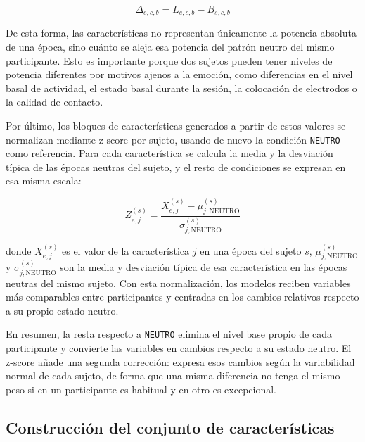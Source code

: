 \begin{myequation}[H]
\[
\Delta_{e,c,b} = L_{e,c,b} - B_{s,c,b}
\]
\caption{Diferencia logarítmica respecto a la condición neutra del mismo sujeto.}
\label{eq:delta_neutro}
\end{myequation}

De esta forma, las características no representan únicamente la potencia absoluta de una época, sino cuánto se aleja esa potencia del patrón neutro del mismo participante. Esto es importante porque dos sujetos pueden tener niveles de potencia diferentes por motivos ajenos a la emoción, como diferencias en el nivel basal de actividad, el estado basal durante la sesión, la colocación de electrodos o la calidad de contacto.

Por último, los bloques de características generados a partir de estos valores se normalizan mediante z-score por sujeto, usando de nuevo la condición \texttt{NEUTRO} como referencia. Para cada característica se calcula la media y la desviación típica de las épocas neutras del sujeto, y el resto de condiciones se expresan en esa misma escala:

\begin{myequation}[H]
\[
Z_{e,j}^{(s)} = \frac{X_{e,j}^{(s)} - \mu_{j,\mathrm{NEUTRO}}^{(s)}}{\sigma_{j,\mathrm{NEUTRO}}^{(s)}}
\]
\caption{Normalización z-score por sujeto usando la condición neutra como referencia.}
\label{eq:zscore_neutro}
\end{myequation}

donde \(X_{e,j}^{(s)}\) es el valor de la característica \(j\) en una época del sujeto \(s\), \(\mu_{j,\mathrm{NEUTRO}}^{(s)}\) y \(\sigma_{j,\mathrm{NEUTRO}}^{(s)}\) son la media y desviación típica de esa característica en las épocas neutras del mismo sujeto. Con esta normalización, los modelos reciben variables más comparables entre participantes y centradas en los cambios relativos respecto a su propio estado neutro.

En resumen, la resta respecto a \texttt{NEUTRO} elimina el nivel base propio de cada participante y convierte las variables en cambios respecto a su estado neutro. El z-score añade una segunda corrección: expresa esos cambios según la variabilidad normal de cada sujeto, de forma que una misma diferencia no tenga el mismo peso si en un participante es habitual y en otro es excepcional.

\subsection{Construcción del conjunto de características}

